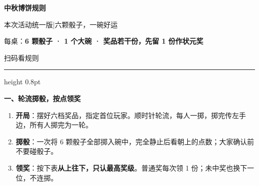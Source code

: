 \documentclass[11pt,a4paper,fontset=none]{ctexart}
\newcommand{\shead}[2]{\par\vspace{7pt}%
  {\fontsize{12.5}{17}\selectfont\bfseries\sffamily
  #1、#2\hspace{10pt}{\color{rulegray}\leaders\hrule height 0.3pt\hfill}\kern0pt\par}\vspace{4pt}}
\begin{document}
\fontsize{11}{16}\selectfont
\begin{minipage}[c]{0.79\linewidth}
  {\fontsize{28}{34}\selectfont\bfseries 中秋博饼规则\par}
  \vspace{7pt}
  {\fontsize{10.5}{14.5}\selectfont 本次活动统一版\quad |\quad 六颗骰子，一碗好运\par}
  \vspace{7pt}
  {\fontsize{10.5}{14.5}\selectfont 每桌：\textbf{6 颗骰子 · 1 个大碗 · 奖品若干份，先留 1 份作状元奖}\par}
\end{minipage}\hfill
\begin{minipage}[c]{0.18\linewidth}
  \centering
  \par
  {\fontsize{9}{11}\selectfont\sffamily 扫码看规则\par}
\end{minipage}\par
\vspace{5pt}\hrule height 0.8pt

\shead{一}{轮流掷骰，按点领奖}
\begin{enumerate}
  \item \textbf{开局}：摆好六档奖品，指定首位玩家。顺时针轮流，每人一掷，掷完传左手边，所有人掷完为一轮。
  \item \textbf{掷骰}：一次将 6 颗骰子全部掷入碗中，完全静止后看朝上的点数；大家确认前不要碰骰子。
  \item \textbf{领奖}：按下表\textbf{从上往下，只认最高奖级}。普通奖每次领 1 份；未中奖也换下一位，不连掷。
\end{enumerate}
\end{document}
